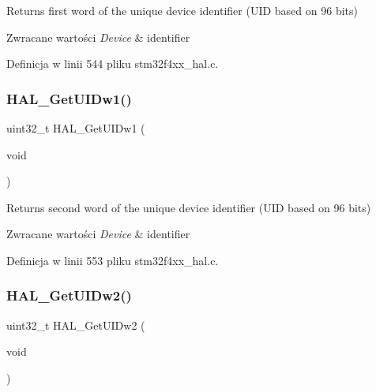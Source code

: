 Returns first word of the unique device identifier (U\+ID based on 96 bits) 


\begin{DoxyRetVals}{Zwracane wartości}
{\em Device} & identifier \\
\hline
\end{DoxyRetVals}


Definicja w linii 544 pliku stm32f4xx\+\_\+hal.\+c.

\mbox{\label{group___h_a_l___exported___functions___group2_ga52720dd92ed2bd4314a2a129855d766c}} 
\subsubsection{\texorpdfstring{H\+A\+L\+\_\+\+Get\+U\+I\+Dw1()}{HAL\_GetUIDw1()}}
{\footnotesize\ttfamily uint32\+\_\+t H\+A\+L\+\_\+\+Get\+U\+I\+Dw1 (\begin{DoxyParamCaption}\item[{void}]{ }\end{DoxyParamCaption})}



Returns second word of the unique device identifier (U\+ID based on 96 bits) 


\begin{DoxyRetVals}{Zwracane wartości}
{\em Device} & identifier \\
\hline
\end{DoxyRetVals}


Definicja w linii 553 pliku stm32f4xx\+\_\+hal.\+c.

\mbox{\label{group___h_a_l___exported___functions___group2_ga5785ae5ec8d4c5a7dadb1359f0778700}} 
\subsubsection{\texorpdfstring{H\+A\+L\+\_\+\+Get\+U\+I\+Dw2()}{HAL\_GetUIDw2()}}
{\footnotesize\ttfamily uint32\+\_\+t H\+A\+L\+\_\+\+Get\+U\+I\+Dw2 (\begin{DoxyParamCaption}\item[{void}]{ }\end{DoxyParamCaption})}



